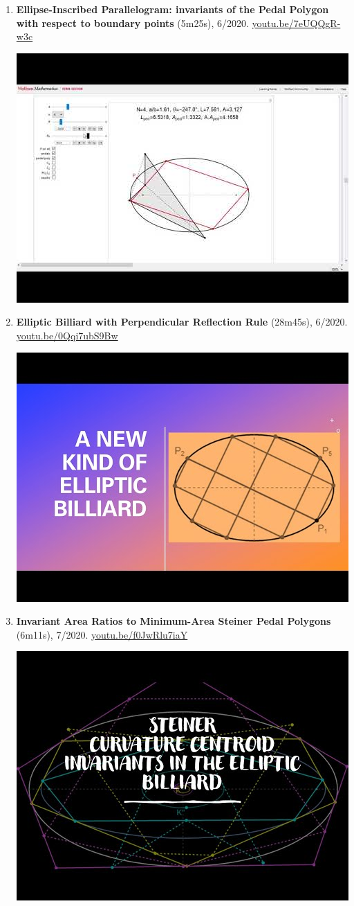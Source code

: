 \documentclass[12pt]{article}
\begin{document}
\begin{enumerate}[resume]
% 
\item \textbf{Ellipse-Inscribed Parallelogram: invariants of the Pedal Polygon with respect to boundary points} (5m25s), 6/2020. \href{https://youtu.be/7eUQQgR-w3c}{\url{youtu.be/7eUQQgR-w3c}}
\begin{center}\includegraphics[width=.5\textwidth]{pics/7eUQQgR-w3c.jpg}\end{center}
% 
\item \textbf{Elliptic Billiard with Perpendicular Reflection Rule} (28m45s), 6/2020. \href{https://youtu.be/0Qqi7ubS9Bw}{\url{youtu.be/0Qqi7ubS9Bw}}
\begin{center}\includegraphics[width=.5\textwidth]{pics/0Qqi7ubS9Bw.jpg}\end{center}
% 
\item \textbf{Invariant Area Ratios to Minimum-Area Steiner Pedal Polygons} (6m11s), 7/2020. \href{https://youtu.be/f0JwRlu7iaY}{\url{youtu.be/f0JwRlu7iaY}}
\begin{center}\includegraphics[width=.5\textwidth]{pics/f0JwRlu7iaY.jpg}\end{center}

\end{enumerate}
\end{document}
